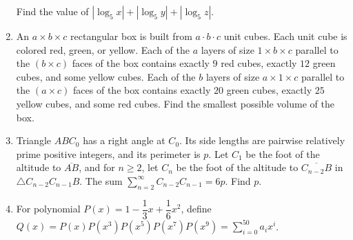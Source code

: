 \documentclass{article}
\begin{document}
\begin{enumerate}[label=\arabic*., itemsep=0.5em]
Find the value of \(|\log_5 x|+|\log_5 y|+|\log_5 z|\).\par \vspace{0.5em}\item An \(a \times b \times c\) rectangular box is built from \(a \cdot b \cdot c\) unit cubes. Each unit cube is colored red, green, or yellow. Each of the \(a\) layers of size \(1 \times b \times c\) parallel to the \((b \times c)\) faces of the box contains exactly \(9\) red cubes, exactly \(12\) green cubes, and some yellow cubes. Each of the \(b\) layers of size \(a \times 1 \times c\) parallel to the \((a \times c)\) faces of the box contains exactly \(20\) green cubes, exactly \(25\) yellow cubes, and some red cubes. Find the smallest possible volume of the box.\par \vspace{0.5em}\item Triangle \(ABC_0\) has a right angle at \(C_0\). Its side lengths are pairwise relatively prime positive integers, and its perimeter is \(p\). Let \(C_1\) be the foot of the altitude to \(\overline{AB}\), and for \(n \geq 2\), let \(C_n\) be the foot of the altitude to \(\overline{C_{n-2}B}\) in \(\triangle C_{n-2}C_{n-1}B\). The sum \(\sum_{n=2}^\infty C_{n-2}C_{n-1} = 6p\). Find \(p\).\par \vspace{0.5em}\item For polynomial \(P(x)=1-\dfrac{1}{3}x+\dfrac{1}{6}x^{2}\), define
\(Q(x)=P(x)P(x^{3})P(x^{5})P(x^{7})P(x^{9})=\sum_{i=0}^{50} a_ix^{i}\).

\end{enumerate}
\end{document}
